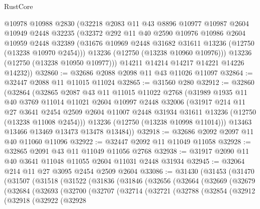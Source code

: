 \begin{lexlean}{RustCore}
\begin{coremodule}
        @10978
        @10988
        @2830
        (@32218
          @2083
          @11
          @43
          @8896
          @10977
          @10987
          @2604
          @10949
          @2448
          @32235
          (@32372
            @292
            @11
            @40
            @2590
            @10976
            @10986
            @2604
            @10959
            @2448
            @32389
            (@31676 @10969 @2448 @31682 @31611 @13236 (@12750 (@13238 @10970 @2454)))
            @13236
            (@12750 (@13238 @10960 @10976)))
          @13236
          (@12750 (@13238 @10950 @10977)))
        @14211
        @14214
        @14217
        @14221
        @14226
        @14232))
@32860 := @32686 @2088 @2098 @11 @43 @11026 @11097
@32864 := @32447 @2088 @11 @11015 @11024
@32865 := @31560 @280
@32912 := @32860
    (@32864
      (@32865
        @2087
        @43
        @11
        @11015
        @11022
        @2768
        (@31989
          @1935
          @11
          @40
          @3769
          @11014
          @11021
          @2604
          @10997
          @2448
          @32006
          (@31917
            @214
            @11
            @27
            @3641
            @2454
            @2509
            @2604
            @11007
            @2448
            @31934
            @31611
            @13236
            (@12750 (@13238 @11008 @2454)))
          @13236
          (@12750 (@13238 @10998 @11014)))
        @13463
        @13466
        @13469
        @13473
        @13478
        @13484))
@32918 := @32686 @2092 @2097 @11 @40 @11060 @11096
@32922 := @32447 @2092 @11 @11049 @11058
@32928 := @32865 @2091 @43 @11 @11049 @11056 @2768
@32938 := @31917 @2090 @11 @40 @3641 @11048 @11055 @2604 @11031 @2448 @31934
@32945 := @32064 @214 @11 @27 @3095 @2454 @2509 @2604
@33086 := @31430
    (@31453
      (@31470
        (@31507
          (@31518
            (@31522
              (@31836
                (@31846
                  (@32656
                    (@32664
                      (@32669
                        (@32679
                          (@32684
                            (@32693
                              (@32700
                                (@32707
                                  (@32714
                                    (@32721
                                      (@32788
                                        (@32854
                                          (@32912
                                            (@32918
                                              (@32922
                                                (@32928

\end{coremodule}
\end{lexlean}
